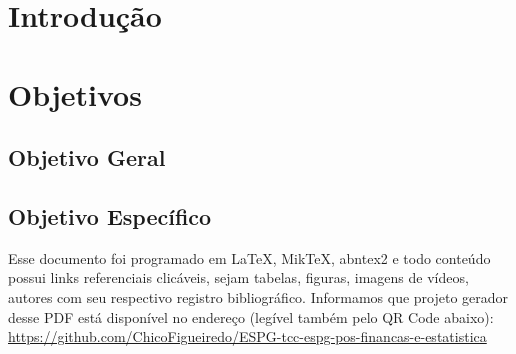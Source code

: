 \chapter{Introdução}
\chapter{Objetivos}

\section{Objetivo Geral}

\section{Objetivo Específico}

Esse documento foi programado em \LaTeX, MikTeX, abntex2 e todo conteúdo possui links referenciais clicáveis, sejam tabelas, figuras, imagens de vídeos, autores com seu respectivo registro bibliográfico.
Informamos que projeto gerador desse PDF está disponível no endereço (legível também pelo QR Code abaixo): \\
\url{https://github.com/ChicoFigueiredo/ESPG-tcc-espg-pos-financas-e-estatistica} \\
\begin{center}
    \href{https://github.com/ChicoFigueiredo/ESPG-tcc-espg-pos-financas-e-estatistica}{
    }
\end{center}

